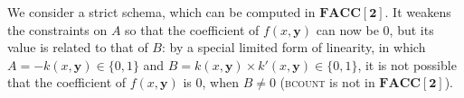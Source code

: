 \documentclass[11pt, oneside]{article}
\newenvironment{toappendix}{}{}
\newcommand{\fun}[1]{\mathsf{#1}}
\newcommand{\Nat}{\mathbb{N}}
\newcommand{\FACC}{\mathbf{FACC[2]}}
\newcommand{\tu}[1]{\mathbf{#1}}
\newtheorem{lemma}{Lemma}
\theoremstyle{definition}
\newtheorem{remark}{Remark}
\newcommand{\ODEACC}{\ell\text{-ODE}_{\text{FACC[2]}}}
\begin{document}
\begin{toappendix}











We consider a strict schema, which can be computed in $\FACC$.
%
It weakens the constraints on $A$ so that %
the coefficient of $f(x, \tu y)$ can now be 0, but its value is related to that of $B$:
%
by a special limited form of linearity, in which $A=-k(x,\tu y)\in \{0,1\}$ and $B=k(x, \tu y)\times k'(x, \tu y)\in \{0,1\}$, it is not possible that the coefficient of $f(x,\tu y)$ is 0, when $B\neq 0$ (\textsc{bcount} is not in $\FACC$).


\end{toappendix}
\end{document}
